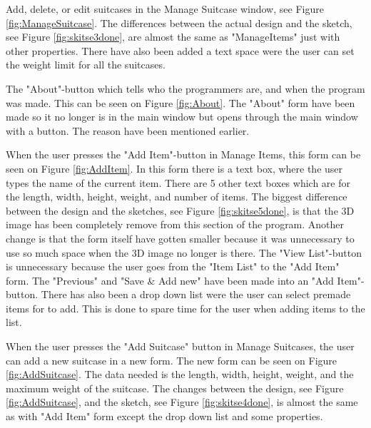 Add, delete, or edit suitcases in the Manage Suitcase window, see Figure \ref{fig:ManageSuitcase}. The differences between the actual design and the sketch, see Figure \ref{fig:skitse3done}, are almost the same as "ManageItems" just with other properties. There have also been added a text space were the user can set the weight limit for all the suitcases.

The "About"-button which tells who the programmers are, and when the program was made. This can be seen on Figure \ref{fig:About}. The "About" form have been made so it no longer is in the main window but opens through the main window with a button. The reason have been mentioned earlier.

When the user presses the "Add Item"-button in Manage Items, this form can be seen on Figure \ref{fig:AddItem}. In this form there is a text box, where the user types the name of the current item. There are 5 other text boxes which are for the length, width, height, weight, and number of items. The biggest difference between the design and the sketches, see Figure \ref{fig:skitse5done}, is that the 3D image has been completely remove from this section of the program. Another change is that the form itself have gotten smaller because it was unnecessary to use so much space when the 3D image no longer is there. The "View List"-button is unnecessary because the user goes from the "Item List" to the "Add Item" form. The "Previous" and "Save \& Add new" have been made into an "Add Item"-button. There has also been a drop down list were the user can select premade items for to add. This is done to spare time for the user when adding items to the list.

When the user presses the "Add Suitcase" button in Manage Suitcases, the user can add a new suitcase in a new form. The new form can be seen on Figure \ref{fig:AddSuitcase}. The data needed is the length, width, height, weight, and the maximum weight of the suitcase. The changes between the design, see Figure \ref{fig:AddSuitcase}, and the sketch, see Figure \ref{fig:skitse4done}, is almost the same as with "Add Item" form except the drop down list and some properties.


